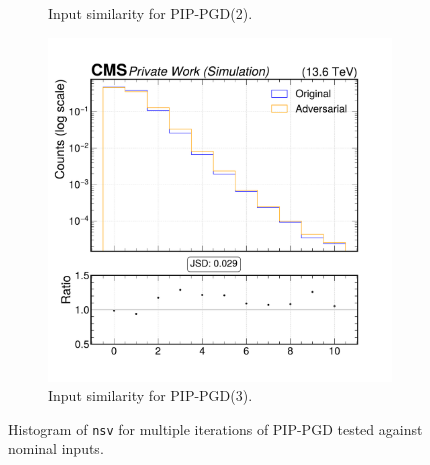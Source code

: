 \begin{figure}[htbp]
\begin{subfigure}[t]{0.32\textwidth}
    \caption*{Input similarity for PIP-PGD(2).}
  \end{subfigure}\hfill
  \begin{subfigure}[t]{0.32\textwidth}
    \includegraphics[width=\linewidth]{media/output/features/compare/combined_it_3/cmp_global_features_nsv.pdf}
    \caption*{Input similarity for PIP-PGD(3).}
  \end{subfigure}

  \caption*{Histogram of \texttt{nsv} for multiple iterations of PIP-PGD tested against nominal inputs.}
  \label{fig:combined_input_nsv}
\end{figure}

